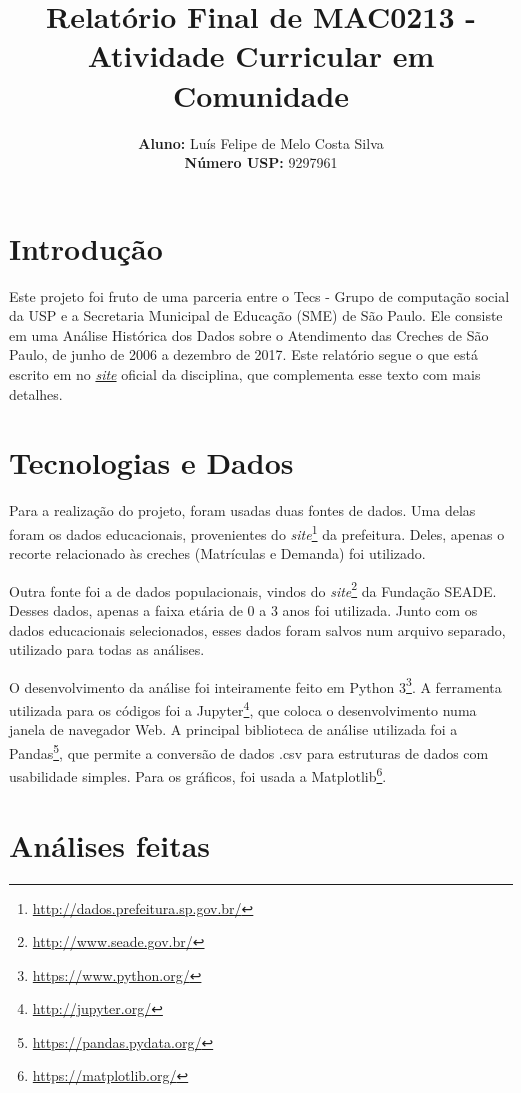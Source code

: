 \documentclass[12pt, a4paper]{article}
\title{\textbf{Relatório Final de MAC0213 - Atividade Curricular em Comunidade}}
\author{
    \textbf{Aluno:} Luís Felipe de Melo Costa Silva \\
    \textbf{Número USP:} 9297961
    }
\date{}
\begin{document}
\maketitle

\section*{Introdução}

Este projeto foi fruto de uma parceria entre o Tecs - Grupo de computação social da USP e a Secretaria Municipal de Educação (SME) de São Paulo. Ele consiste em uma Análise Histórica dos Dados sobre o Atendimento das Creches de São Paulo, de junho de 2006 a dezembro de 2017. Este relatório segue o que está escrito em no \href{https://lsflp.github.io/MAC0213/}{\textit{site}} oficial da disciplina, que complementa esse texto com mais detalhes.

\section{Tecnologias e Dados}

Para a realização do projeto, foram usadas duas fontes de dados. Uma delas foram os dados educacionais, provenientes do \textit{site}\footnote{\url{http://dados.prefeitura.sp.gov.br/}} da prefeitura. Deles, apenas o recorte relacionado às creches (Matrículas e Demanda) foi utilizado. 

Outra fonte foi a de dados populacionais, vindos do \textit{site}\footnote{\url{http://www.seade.gov.br/}} da Fundação SEADE. Desses dados, apenas a faixa etária de 0 a 3 anos foi utilizada. Junto com os dados educacionais selecionados, esses dados foram salvos num arquivo separado, utilizado para todas as análises.

O desenvolvimento da análise foi inteiramente feito em Python 3\footnote{\url{https://www.python.org/}}. A ferramenta utilizada para os códigos foi a Jupyter\footnote{\url{http://jupyter.org/}}, que coloca o desenvolvimento numa janela de navegador Web. A principal biblioteca de análise utilizada foi a Pandas\footnote{\url{https://pandas.pydata.org/}}, que permite a conversão de dados .csv para estruturas de dados com usabilidade simples. Para os gráficos, foi usada a Matplotlib\footnote{\url{https://matplotlib.org/}}.

\section{Análises feitas}
\end{document}
